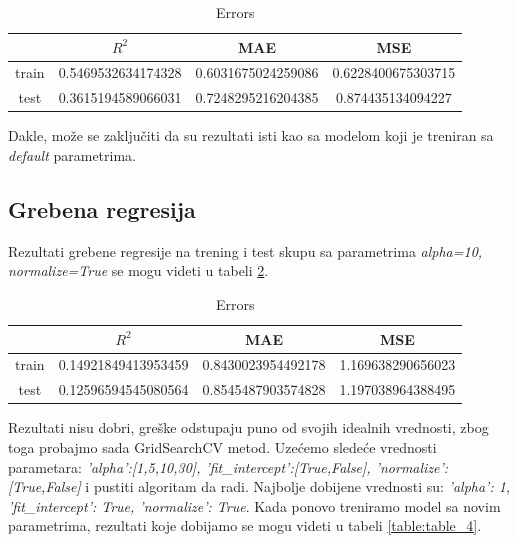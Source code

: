 \documentclass[a4paper]{article}
\begin{document}
\begin{table}[h!]
\caption{Errors}
\centering %
\begin{tabular}{c c c c} %
\hline\hline %
 & ${R}^2$ & MAE & MSE \\ [0.2ex] %
\hline %
train & 0.5469532634174328 & 0.6031675024259086 & 0.6228400675303715 \\ %
test & 0.3615194589066031 & 0.7248295216204385 & 0.874435134094227 \\ [1ex] %
\end{tabular}
\label{table:table_2}
\end{table}

Dakle, može se zaključiti da su rezultati isti kao sa modelom koji je treniran sa \textit{default} parametrima.


\subsection{Grebena regresija}
\label{sec:ridge_1}

Rezultati grebene regresije na trening i test skupu sa parametrima \textit{alpha=10, normalize=True} se mogu videti u tabeli \ref{table:table_3}.

\begin{table}[h!]
\caption{Errors}
\centering %
\begin{tabular}{c c c c} %
\hline\hline %
 & ${R}^2$ & MAE & MSE \\ [0.2ex] %
\hline %
train & 0.14921849413953459 & 0.8430023954492178 & 1.169638290656023 \\ %
test & 0.12596594545080564 & 0.8545487903574828 & 1.197038964388495 \\ [1ex] %
\end{tabular}
\label{table:table_3}
\end{table}

Rezultati nisu dobri, greške odstupaju puno od svojih idealnih vrednosti, zbog toga probajmo sada GridSearchCV metod. Uzećemo sledeće vrednosti parametara: \textit{'alpha':[1,5,10,30], 'fit\_intercept':[True,False], 'normalize':[True,False]} i pustiti algoritam da radi. Najbolje dobijene vrednosti su: \textit{{'alpha': 1, 'fit\_intercept': True, 'normalize': True}}. Kada ponovo treniramo model sa novim parametrima, rezultati koje dobijamo se mogu videti u tabeli \ref{table:table_4}.
\end{document}
